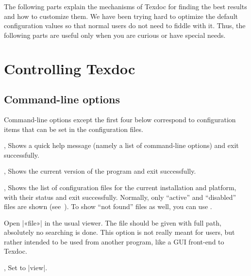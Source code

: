 \documentclass[draft]{texdoc-doc}
\begin{document}
The following parts explain the mechanisms of Texdoc for finding the best
results and how to customize them. We have been trying hard to optimize the
default configuration values so that normal users do not need to fiddle with
it. Thus, the following parts are useful only when you are curious or have
special needs.

\clearpage

\section{Controlling Texdoc}

\subsection{Command-line options}
\label{sec:cl}

Command-line options except the first four below correspond to configuration
items that can be set in the configuration files.

\begin{clopt}{, }
Shows a quick help message (namely a list of command-line options) and exit
successfully.
\end{clopt}

\begin{clopt}{, }
Shows the current version of the program and exit successfully.
\end{clopt}

\begin{clopt}{, }
Shows the list of configuration files for the current installation and
platform, with their status and exit successfully. Normally, only ``active''
and ``disabled'' files are shown (see~). To show ``not
found'' files as well, you can use .
\end{clopt}

\begin{clopt}{}
Open |«file»| in the usual viewer. The file should be given with full path,
absolutely no searching is done. This option is not really meant for users,
but rather intended to be used from another program, like a GUI front-end to
Texdoc.
\end{clopt}

\begin{clopt}{, }
Set  to |view|.
\end{clopt}
\end{document}
